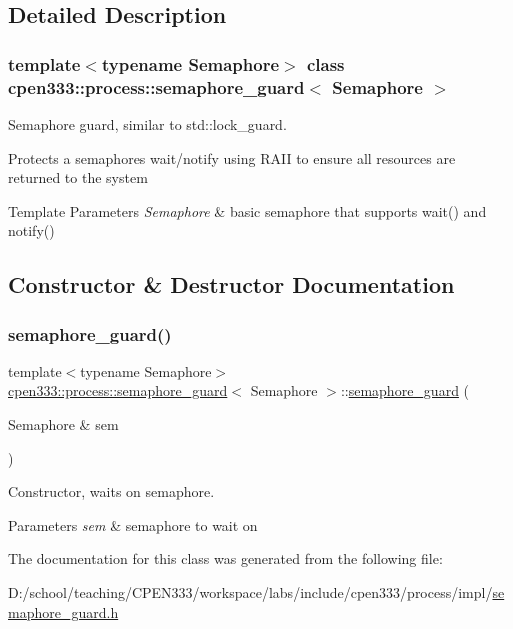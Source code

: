\subsection{Detailed Description}
\subsubsection*{template$<$typename Semaphore$>$\newline
class cpen333\+::process\+::semaphore\+\_\+guard$<$ Semaphore $>$}

Semaphore guard, similar to std\+::lock\+\_\+guard. 

Protects a semaphore\textquotesingle{}s wait/notify using R\+A\+II to ensure all resources are returned to the system 
\begin{DoxyTemplParams}{Template Parameters}
{\em Semaphore} & basic semaphore that supports wait() and notify() \\
\hline
\end{DoxyTemplParams}


\subsection{Constructor \& Destructor Documentation}
\mbox{\label{classcpen333_1_1process_1_1semaphore__guard_aa816ac26e4894b1945724944e7965968}} 
\subsubsection{\texorpdfstring{semaphore\+\_\+guard()}{semaphore\_guard()}}
{\footnotesize\ttfamily template$<$typename Semaphore$>$ \\
\hyperlink{classcpen333_1_1process_1_1semaphore__guard}{cpen333\+::process\+::semaphore\+\_\+guard}$<$ Semaphore $>$\+::\hyperlink{classcpen333_1_1process_1_1semaphore__guard}{semaphore\+\_\+guard} (\begin{DoxyParamCaption}\item[{Semaphore \&}]{sem }\end{DoxyParamCaption})\hspace{0.3cm}{\ttfamily [inline]}}



Constructor, waits on semaphore. 


\begin{DoxyParams}{Parameters}
{\em sem} & semaphore to wait on \\
\hline
\end{DoxyParams}


The documentation for this class was generated from the following file\+:\begin{DoxyCompactItemize}
\item 
D\+:/school/teaching/\+C\+P\+E\+N333/workspace/labs/include/cpen333/process/impl/\hyperlink{semaphore__guard_8h}{semaphore\+\_\+guard.\+h}\end{DoxyCompactItemize}

